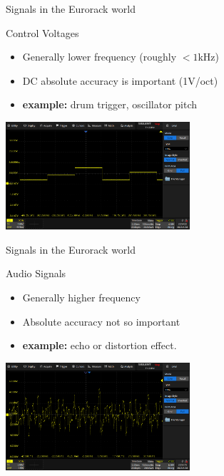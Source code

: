 \documentclass{beamer}
\begin{document}
\begin{frame}{Signals in the Eurorack world}

    \begin{block}{Control Voltages}
        \begin{itemize}
            \item Generally lower frequency (roughly $<1$kHz)
            \item DC absolute accuracy is important (1V/oct)
            \item \textbf{example:} drum trigger, oscillator pitch
        \end{itemize}
    \end{block}


    \begin{center}
        \includegraphics[height=4cm]{img/scope_cv.png}
    \end{center}

\end{frame}

\begin{frame}{Signals in the Eurorack world}

    \begin{block}{Audio Signals}
        \begin{itemize}
            \item Generally higher frequency
            \item Absolute accuracy not so important
            \item \textbf{example:} echo or distortion effect.
        \end{itemize}
    \end{block}


    \begin{center}
        \includegraphics[height=4cm]{img/scope_audio.png}
    \end{center}

\end{frame}
\end{document}
